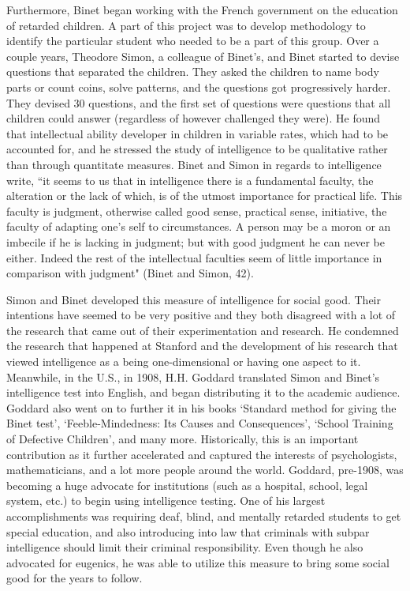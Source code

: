 \documentclass[11pt, oneside]{article}
\begin{document}
\par Furthermore, Binet began working with the French government on the education of retarded children. A part of this project was to develop methodology to identify the particular student who needed to be a part of this group. Over a couple years, Theodore Simon, a colleague of Binet's, and Binet started to devise questions that separated the children. They asked the children to name body parts or count coins, solve patterns, and the questions got progressively harder. They devised 30 questions, and the first set of questions were questions that all children could answer (regardless of however challenged they were). He found that intellectual ability developer in children in variable rates, which had to be accounted for, and he stressed the study of intelligence to be qualitative rather than through quantitate measures. Binet and Simon in regards to intelligence write, ``it seems to us that in intelligence there is a fundamental faculty, the alteration or the lack of which, is of the utmost importance for practical life. This faculty is judgment, otherwise called good sense, practical sense, initiative, the faculty of adapting one's self to circumstances. A person may be a moron or an imbecile if he is lacking in judgment; but with good judgment he can never be either. Indeed the rest of the intellectual faculties seem of little importance in comparison with judgment" (Binet and Simon, 42). 

\par Simon and Binet developed this measure of intelligence for social good. Their intentions have seemed to be very positive and they both disagreed with a lot of the research that came out of their experimentation and research. He condemned the research that happened at Stanford and the development of his research that viewed intelligence as a being one-dimensional or having one aspect to it. Meanwhile, in the U.S., in 1908, H.H. Goddard translated Simon and Binet's intelligence test into English, and began distributing it to the academic audience. Goddard also went on to further it in his books `Standard method for giving the Binet test', `Feeble-Mindedness: Its Causes and Consequences', `School Training of Defective Children', and many more. Historically, this is an important contribution as it further accelerated and captured the interests of psychologists, mathematicians, and a lot more people around the world. Goddard, pre-1908, was becoming a huge advocate for institutions (such as a hospital, school, legal system, etc.) to begin using intelligence testing. One of his largest accomplishments was requiring deaf, blind, and mentally retarded students to get special education, and also introducing into law that criminals with subpar intelligence should limit their criminal responsibility. Even though he also advocated for eugenics, he was able to utilize this measure to bring some social good for the years to follow.
\end{document}
